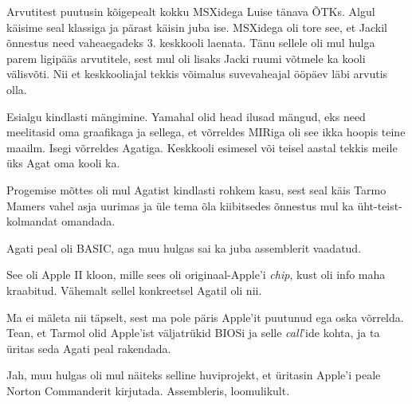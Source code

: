 Arvutitest puutusin kõigepealt kokku MSXidega Luise tänava ÕTKs. 
Algul käisime seal klassiga ja pärast käisin juba ise. 
MSXidega oli tore see, et Jackil õnnestus need 
vaheaegadeks 3. keskkooli laenata. Tänu sellele oli mul hulga parem ligipääs arvutitele, sest mul oli lisaks Jacki ruumi võtmele ka kooli välisvõti. Nii et
keskkooliajal tekkis võimalus suvevaheajal ööpäev läbi arvutis olla.


Esialgu kindlasti mängimine. Yamahal olid head ilusad mängud, eks need meelitasid 
oma graafikaga ja sellega, et võrreldes MIRiga oli see ikka hoopis teine maailm. 
Isegi võrreldes Agatiga. Keskkooli 
esimesel või teisel aastal tekkis meile üks Agat oma kooli ka. 

Progemise mõttes oli mul Agatist kindlasti rohkem kasu, sest seal käis 
Tarmo Mamers vahel asja 
uurimas ja üle tema õla kiibitsedes õnnestus mul ka üht-teist-kolmandat 
omandada.

Agati peal oli BASIC, aga muu hulgas sai ka juba assemblerit 
vaadatud.


See oli Apple II kloon, mille sees oli originaal-Apple'i \emph{chip}, kust oli info maha kraabitud. Vähemalt sellel konkreetsel Agatil oli 
nii.


Ma ei mäleta nii täpselt, sest ma pole päris Apple'it puutunud ega oska võrrelda. Tean, et Tarmol olid Apple'ist 
väljatrükid BIOSi ja selle \emph{call}'ide kohta, ja ta üritas seda 
Agati peal rakendada.


Jah, muu hulgas oli mul näiteks selline huviprojekt, et üritasin
Apple'i peale Norton Commanderit kirjutada. 
Assembleris, loomulikult.


